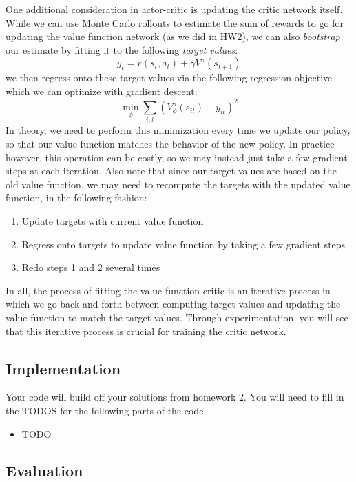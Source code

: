 One additional consideration in actor-critic is updating the critic network itself. While we can use Monte Carlo rollouts to estimate the sum of rewards to go for updating the value function network (as we did in HW2), we can also \textit{bootstrap} our estimate by fitting it to the following \textit{target values}:
$$y_t = r(s_t, a_t) + \gamma V^\pi(s_{t+1})$$
we then regress onto these target values via the following regression objective which we can optimize with gradient descent:
$$\min_{\phi} \sum_{i,t} (V_{\phi}^\pi(s_{it}) - y_{it})^2$$
In theory, we need to perform this minimization every time we update our policy, so that our value function matches the behavior of the new policy. In practice however, this operation can be costly, so we may instead just take a few gradient steps at each iteration. Also note that since our target values are based on the old value function, we may need to recompute the targets with the updated value function, in the following fashion:
\begin{enumerate}
    \item Update targets with current value function
    \item Regress onto targets to update value function by taking a few gradient steps
    \item Redo steps 1 and 2 several times
\end{enumerate}
In all, the process of fitting the value function critic is an iterative process in which we go back and forth between computing target values and updating the value function to match the target values. Through experimentation, you will see that this iterative process is crucial for training the critic network.

\subsection{Implementation}

Your code will build off your solutions from homework 2. You will need to fill in the TODOS for the following parts of the code.

\begin{itemize}
    \item {\color{red} TODO}
\end{itemize}
 
\subsection{Evaluation}

